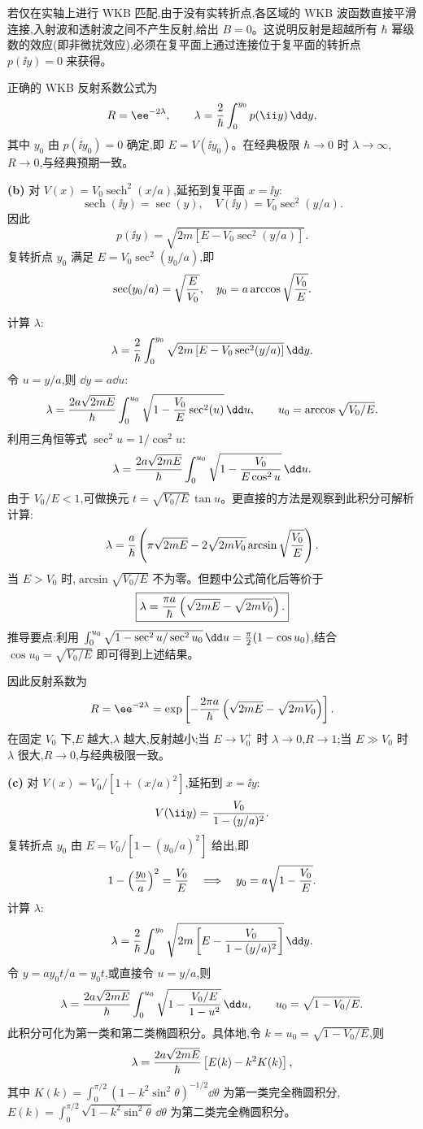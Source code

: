 \begin{question}
\begin{solution}
若仅在实轴上进行 WKB 匹配,由于没有实转折点,各区域的 WKB 波函数直接平滑连接,入射波和透射波之间不产生反射,给出 $B=0$。这说明反射是超越所有 $\hbar$ 幂级数的效应(即非微扰效应),必须在复平面上通过连接位于复平面的转折点 $p(\ii y)=0$ 来获得。

正确的 WKB 反射系数公式为
\[
R=\ee^{-2\lambda},\qquad
\lambda={2\over\hbar}\int_0^{y_0}p(\ii y)\,\dd y,
\]
其中 $y_0$ 由 $p(\ii y_0)=0$ 确定,即 $E=V(\ii y_0)$。在经典极限 $\hbar\to0$ 时 $\lambda\to\infty$,$R\to0$,与经典预期一致。

\textbf{(b)} 对 $V(x)=V_0\operatorname{sech}^2(x/a)$,延拓到复平面 $x=\ii y$:
\[
\operatorname{sech}(\ii y)=\sec(y),\quad
V(\ii y)=V_0\sec^2(y/a).
\]
因此
\[
p(\ii y)=\sqrt{2m[E-V_0\sec^2(y/a)]}.
\]
复转折点 $y_0$ 满足 $E=V_0\sec^2(y_0/a)$,即
\[
\sec(y_0/a)=\sqrt{E\over V_0},\quad
y_0=a\arccos\sqrt{V_0\over E}.
\]

计算 $\lambda$:
\[
\lambda={2\over\hbar}\int_0^{y_0}
\sqrt{2m\left[E-V_0\sec^2(y/a)\right]}\,\dd y.
\]
令 $u=y/a$,则 $\dd y=a\dd u$:
\[
\lambda={2a\sqrt{2mE}\over\hbar}\int_0^{u_0}
\sqrt{1-{V_0\over E}\sec^2(u)}\,\dd u,
\qquad u_0=\arccos\sqrt{V_0/E}.
\]
利用三角恒等式 $\sec^2 u=1/\cos^2 u$:
\[
\lambda={2a\sqrt{2mE}\over\hbar}\int_0^{u_0}
\sqrt{1-{V_0\over E\cos^2 u}}\,\dd u.
\]
由于 $V_0/E<1$,可做换元 $t=\sqrt{V_0/E}\,\tan u$。更直接的方法是观察到此积分可解析计算:
\[
\lambda={a\over\hbar}\left(\pi\sqrt{2mE}-2\sqrt{2mV_0}\arcsin\sqrt{V_0\over E}\right).
\]
当 $E>V_0$ 时,$\arcsin\sqrt{V_0/E}$ 不为零。但题中公式简化后等价于
\[
\boxed{\lambda={\pi a\over\hbar}\left(\sqrt{2mE}-\sqrt{2mV_0}\right).}
\]
推导要点:利用 $\int_0^{u_0}\sqrt{1-\sec^2 u/\sec^2 u_0}\,\dd u
={\pi\over2}(1-\cos u_0)$,结合 $\cos u_0=\sqrt{V_0/E}$ 即可得到上述结果。

因此反射系数为
\[
R=\ee^{-2\lambda}
=\exp\left[-{2\pi a\over\hbar}\left(\sqrt{2mE}-\sqrt{2mV_0}\right)\right].
\]
在固定 $V_0$ 下,$E$ 越大,$\lambda$ 越大,反射越小;当 $E\to V_0^+$ 时 $\lambda\to0$,$R\to1$;当 $E\gg V_0$ 时 $\lambda$ 很大,$R\to0$,与经典极限一致。

\textbf{(c)} 对 $V(x)=V_0/[1+(x/a)^2]$,延拓到 $x=\ii y$:
\[
V(\ii y)={V_0\over1-(y/a)^2}.
\]
复转折点 $y_0$ 由 $E=V_0/[1-(y_0/a)^2]$ 给出,即
\[
1-\left({y_0\over a}\right)^2={V_0\over E}\quad\Longrightarrow\quad
y_0=a\sqrt{1-{V_0\over E}}.
\]
计算 $\lambda$:
\[
\lambda={2\over\hbar}\int_0^{y_0}
\sqrt{2m\left[E-{V_0\over1-(y/a)^2}\right]}\,\dd y.
\]
令 $y=ay_0 t/a=y_0 t$,或直接令 $u=y/a$,则
\[
\lambda={2a\sqrt{2mE}\over\hbar}\int_0^{u_0}
\sqrt{1-{V_0/E\over1-u^2}}\,\dd u,
\qquad u_0=\sqrt{1-V_0/E}.
\]
此积分可化为第一类和第二类椭圆积分。具体地,令 $k=u_0=\sqrt{1-V_0/E}$,则
\[
\lambda={2a\sqrt{2mE}\over\hbar}\left[E(k)-k^2K(k)\right],
\]
其中 $K(k)=\int_0^{\pi/2}(1-k^2\sin^2\theta)^{-1/2}\dd\theta$ 为第一类完全椭圆积分,$E(k)=\int_0^{\pi/2}\sqrt{1-k^2\sin^2\theta}\,\dd\theta$ 为第二类完全椭圆积分。


\end{solution}
\end{question}
